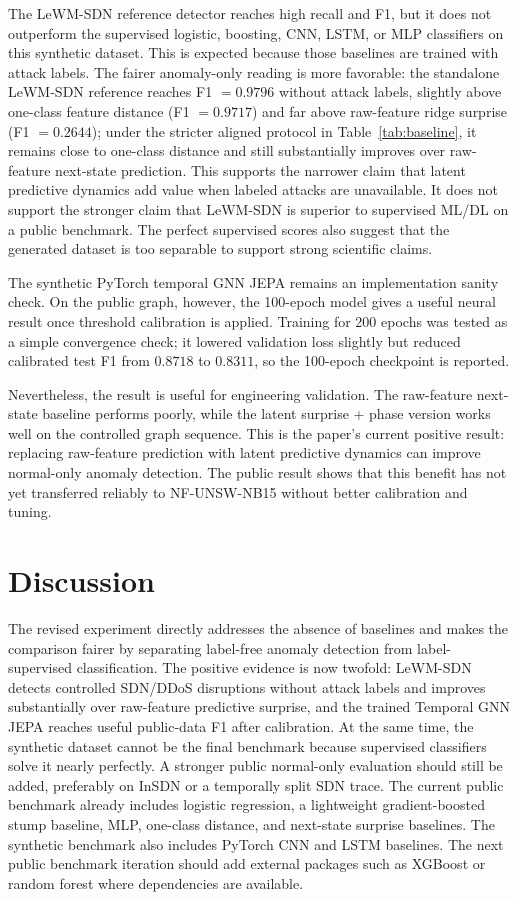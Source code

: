 \documentclass[runningheads]{llncs}
\begin{document}
The LeWM-SDN reference detector reaches high recall and F1, but it does not
outperform the supervised logistic, boosting, CNN, LSTM, or MLP classifiers on
this synthetic dataset. This is expected because those baselines are trained
with attack labels. The fairer anomaly-only reading is more favorable: the
standalone LeWM-SDN reference reaches F1 $=0.9796$ without attack labels,
slightly above one-class feature distance (F1 $=0.9717$) and far above
raw-feature ridge surprise (F1 $=0.2644$); under the stricter aligned protocol
in Table~\ref{tab:baseline}, it remains close to one-class distance and still
substantially improves over raw-feature next-state prediction. This supports
the narrower claim that latent predictive dynamics add value when labeled
attacks are unavailable. It does not support the stronger claim that LeWM-SDN
is superior to supervised ML/DL on a public benchmark. The perfect supervised
scores also suggest that the generated dataset is too separable to support
strong scientific claims.

The synthetic PyTorch temporal GNN JEPA remains an implementation sanity check.
On the public graph, however, the 100-epoch model gives a useful neural result
once threshold calibration is applied. Training for 200 epochs was tested as a
simple convergence check; it lowered validation loss slightly but reduced
calibrated test F1 from $0.8718$ to $0.8311$, so the 100-epoch checkpoint is
reported.

Nevertheless, the result is useful for engineering validation. The raw-feature
next-state baseline performs poorly, while the latent surprise + phase version
works well on the controlled graph sequence. This is the paper's current
positive result: replacing raw-feature prediction with latent predictive
dynamics can improve normal-only anomaly detection. The public result shows
that this benefit has not yet transferred reliably to NF-UNSW-NB15 without
better calibration and tuning.

\section{Discussion}

The revised experiment directly addresses the absence of baselines and makes
the comparison fairer by separating label-free anomaly detection from
label-supervised classification. The positive evidence is now twofold:
LeWM-SDN detects controlled SDN/DDoS disruptions without attack labels and
improves substantially over raw-feature predictive surprise, and the trained
Temporal GNN JEPA reaches useful public-data F1 after calibration. At the same
time, the synthetic dataset cannot be the final benchmark because supervised
classifiers solve it nearly perfectly. A stronger public normal-only evaluation
should still be added, preferably on InSDN or a temporally split SDN trace. The
current public benchmark already includes logistic
regression, a lightweight gradient-boosted stump baseline, MLP, one-class
distance, and next-state surprise baselines. The synthetic benchmark also
includes PyTorch CNN and LSTM baselines. The next public benchmark iteration
should add external packages such as XGBoost or random forest where
dependencies are available.
\end{document}
